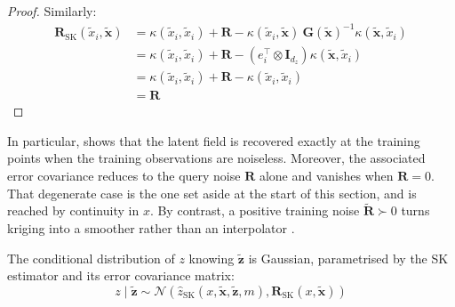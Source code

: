 \begin{proof}
	Similarly:
	\begin{equation}
		\begin{aligned}
			\mathbf{R}_{\mathrm{SK}}(\tilde{x}_i,\tilde{\mathbf{x}})&=\kappa(\tilde{x}_i,\tilde{x}_i)+\mathbf{R}-\kappa(\tilde{x}_i,\tilde{\mathbf{x}})\:\mathbf{G}(\tilde{\mathbf{x}})^{-1}\kappa(\tilde{\mathbf{x}},\tilde{x}_i)\\
			&=\kappa(\tilde{x}_i,\tilde{x}_i)+\mathbf{R}-\left(e_i^\top\otimes \mathbf{I}_{d_z}\right)\kappa(\tilde{\mathbf{x}},\tilde{x}_i)\\
			&=\kappa(\tilde{x}_i,\tilde{x}_i)+\mathbf{R}-\kappa(\tilde{x}_i,\tilde{x}_i)\\
			&=\mathbf{R}
		\end{aligned}
	\end{equation}
\end{proof}

In particular,  shows that the latent field is recovered exactly at the training points when the training observations are noiseless. Moreover, the associated error covariance reduces to the query noise $\mathbf{R}$ alone and vanishes when $\mathbf{R}=0$. That degenerate case is the one set aside at the start of this section, and is reached by continuity in $x$. By contrast, a positive training noise $\tilde{\mathbf{R}}\succ0$ turns kriging into a smoother rather than an interpolator \cite{bib:spline-correspondence}.

\begin{proposition}\label{th:simple_kriging_conditional}
	The conditional distribution of $z$ knowing $\tilde{\mathbf{z}}$ is Gaussian, parametrised by the SK estimator and its error covariance matrix:
	\begin{equation}
		z\mid\tilde{\mathbf{z}}\sim\mathcal{N}\left(\hat{z}_{\mathrm{SK}}(x,\tilde{\mathbf{x}},\tilde{\mathbf{z}},m),\mathbf{R}_{\mathrm{SK}}(x,\tilde{\mathbf{x}})\right)
	\end{equation}
\end{proposition}

